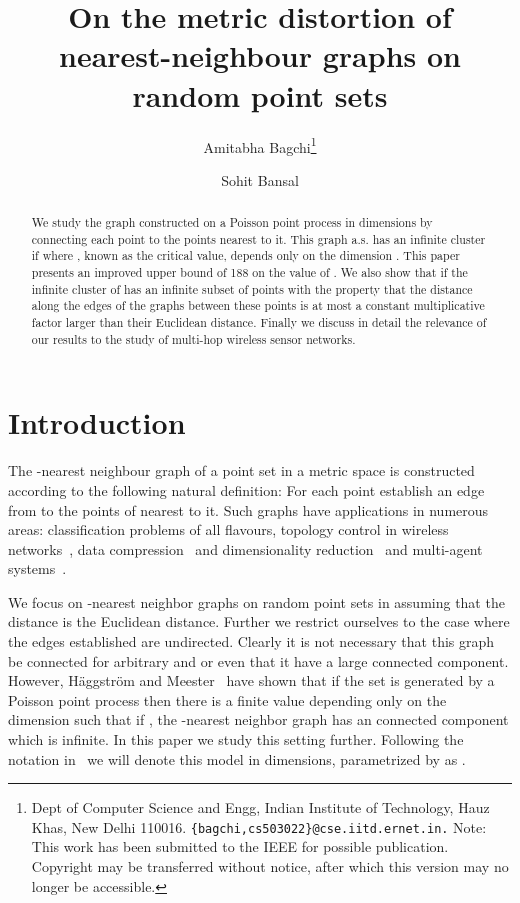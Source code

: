 \documentclass[11pt]{article}
\begin{document}
\title{On the metric distortion of nearest-neighbour graphs on random point sets} 

\author{
 Amitabha Bagchi\thanks{Dept of Computer Science and Engg, Indian Institute of Technology, Hauz Khas, New Delhi 110016. {\tt \{bagchi,cs503022\}@cse.iitd.ernet.in.} Note: This work has been submitted to the IEEE for possible
publication. Copyright may be transferred without notice, after
which this version may no longer be accessible.
}
\and Sohit Bansal\footnotemark[1] 
}
\maketitle 



\begin{abstract}
We study the graph constructed on a Poisson point process in 
dimensions by connecting each point to the  points nearest to
it. This graph a.s. has an infinite cluster if  where
, known as the critical value, depends only on the dimension
. This paper presents an improved upper bound of 188 on the value
of . We also show that if  the infinite cluster of
 has an infinite subset of points with the property that the
distance along the edges of the graphs between these points is at most
a constant multiplicative factor larger than their Euclidean
distance. Finally we discuss in detail the relevance of our results to
the study of multi-hop wireless sensor networks.
\end{abstract}



\section{Introduction} 
\label{sec:intro}

The -nearest neighbour graph of a point set  in a metric space
is constructed according to the following natural definition: For each
point  establish an edge from  to the  points of  nearest to it. Such graphs have applications in
numerous areas: classification problems of all flavours, topology
control in wireless networks~\cite{blough-mobihoc:2003,xue-wn:2004},
data compression~\cite{ouyang-wise:2002,adler-dcc:2001} and
dimensionality reduction~\cite{tenenbaum-science:2000} and multi-agent
systems~\cite{goebels-icnc:2006}.

We focus on -nearest neighbor graphs on random point sets in
 assuming that the distance is the Euclidean distance. Further
we restrict ourselves to the case where the edges established are
undirected. Clearly it is not necessary that this graph be connected
for arbitrary  and  or even that it have a large connected
component. However, H\"aggstr\"om and
Meester~\cite{haggstrom-rsa:1996} have shown that if the set  is
generated by a Poisson point process then there is a finite value
 depending only on the dimension such that if ,
the -nearest neighbor graph has an connected component which is
infinite. In this paper we study this setting further. Following the
notation in~\cite{haggstrom-rsa:1996} we will denote this model in 
dimensions, parametrized by  as .
\end{document}
